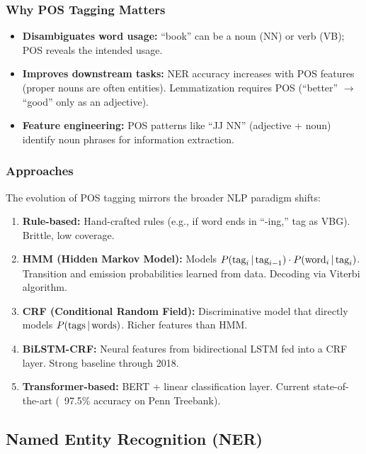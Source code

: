 \subsubsection{Why POS Tagging Matters}

\begin{itemize}
    \item \textbf{Disambiguates word usage:} ``book'' can be a noun (NN) or verb (VB);
    POS reveals the intended usage.
    \item \textbf{Improves downstream tasks:} NER accuracy increases with POS features
    (proper nouns are often entities). Lemmatization requires POS (``better'' $\to$
    ``good'' only as an adjective).
    \item \textbf{Feature engineering:} POS patterns like ``JJ NN'' (adjective + noun)
    identify noun phrases for information extraction.
\end{itemize}

\subsubsection{Approaches}

The evolution of POS tagging mirrors the broader NLP paradigm shifts:
\begin{enumerate}
    \item \textbf{Rule-based:} Hand-crafted rules (e.g., if word ends in ``-ing,'' tag as
    VBG). Brittle, low coverage.
    \item \textbf{HMM (Hidden Markov Model):} Models $P(\text{tag}_i \,|\,
    \text{tag}_{i-1}) \cdot P(\text{word}_i \,|\, \text{tag}_i)$. Transition and
    emission probabilities learned from data. Decoding via Viterbi algorithm.
    \item \textbf{CRF (Conditional Random Field):} Discriminative model that directly
    models $P(\text{tags} \,|\, \text{words})$. Richer features than HMM.
    \item \textbf{BiLSTM-CRF:} Neural features from bidirectional LSTM fed into a CRF
    layer. Strong baseline through 2018.
    \item \textbf{Transformer-based:} BERT + linear classification layer. Current
    state-of-the-art (~97.5\% accuracy on Penn Treebank).
\end{enumerate}

\subsection{Named Entity Recognition (NER)}
\label{sec:classical_ner}


